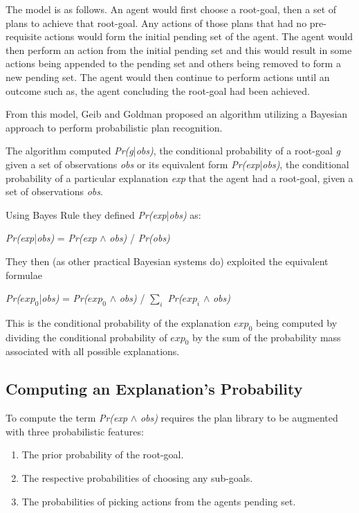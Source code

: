 \documentclass[parskip]{cs4rep}
\begin{document}
The model is as follows. An agent would first choose a root-goal, then a set of plans to achieve that root-goal. Any actions of those plans that had no pre-requisite actions would form the initial pending set of the agent. The agent would then perform an action from the initial pending set and this would result in some actions being appended to the pending set and others being removed to form a new pending set. The agent would then continue to perform actions until an outcome such as, the agent concluding the root-goal had been achieved.

From this model, Geib and Goldman proposed an algorithm utilizing a Bayesian approach to perform probabilistic plan recognition. 

The algorithm computed \textit{Pr(g}|\textit{obs)}, the conditional probability of a root-goal \textit{g} given a set of observations \textit{obs} or its equivalent form \textit{Pr(exp}|\textit{obs)}, the conditional probability of a particular explanation \textit{exp} that the agent had a root-goal, given a set of observations \textit{obs}.

Using Bayes Rule they defined \textit{Pr(exp}|\textit{obs)} as:\newline

\centerline{
\textit{Pr(exp}|\textit{obs)} = \textit{Pr(exp} $\wedge$ \textit{obs)} / \textit{Pr(obs)}
}

They then (as other practical Bayesian systems do) exploited the equivalent formulae\newline

\centerline{
\textit{Pr($exp_0$}|\textit{obs)} = \textit{Pr($exp_0$} $\wedge$ \textit{obs)} / $\displaystyle\sum\nolimits_{i}$ \textit{Pr($exp_i$} $\wedge$ \textit{obs)}
}

This is the conditional probability of the explanation $exp_0$ being computed by dividing the conditional probability of $exp_0$  by the sum of the probability mass associated with all possible explanations.

\subsection{Computing an Explanation's Probability}

To compute the term \textit{Pr(exp} $\wedge$ \textit{obs)} requires the plan library to be augmented with three probabilistic features:\newline

\begin{enumerate}
\item
The prior probability of the root-goal.
\item
The respective probabilities of choosing any sub-goals.
\item
The probabilities of picking actions from the agents pending set.\newline
\end{enumerate}
\end{document}
